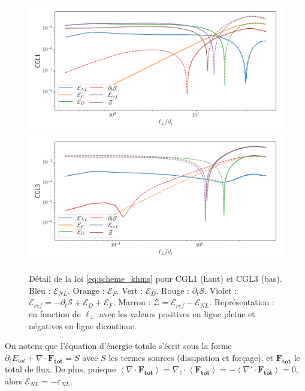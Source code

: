  \begin{figure}[!ht]
  \centering
 \includegraphics[width=0.9\linewidth,trim=0cm 0cm 0cm 0cm, clip=true]{./Mainmatter/Part_3/images_ch2/CGL1_1D_lperp_allSl}
 \includegraphics[width=0.9\linewidth,trim=0cm 0cm 0cm 0.5cm, clip=true]{./Mainmatter/Part_3/images_ch2/CGL3_1D_lperp_allSl}
 \cprotect\caption{Détail de la loi \eqref{eq:scheme_khms} pour CGL1 (haut) et CGL3 (bas). Bleu : \ensuremath{\mathcal{E}_{NL}}. Orange : \ensuremath{\mathcal{E}_{F}}. Vert : \ensuremath{\mathcal{E}_{D}}. Rouge : \ensuremath{\partial_t \mathcal{S}}. Violet : \ensuremath{\mathcal{E}_{ref} =- \partial_t \mathcal{S}  + \mathcal{E}_{D} + \mathcal{E}_{F}}. Marron : \ensuremath{\mathcal{Z} = \mathcal{E}_{ref} - \mathcal{E}_{NL}}. Représentation :  en fonction de \ensuremath{\ell_{\perp}} avec les valeurs positives en ligne pleine et négatives en ligne dicontinue. }
 \label{fig:KHMS}
 \end{figure}
 
On notera que l'équation d'énergie totale s'écrit sous la forme $\partial_t E_{tot} + \nabla \cdot \boldsymbol{F_{tot}} = S$ avec $S$ les termes sources (dissipation et forçage), et $\boldsymbol{F_{tot}}$ le total de flux. De plus, puisque $\left<  \nabla \cdot \boldsymbol{F_{tot}} \right> = \nabla_{\boldsymbol{\ell}} \cdot \left< \boldsymbol{F_{tot}} \right> = - \left<  \nabla' \cdot \boldsymbol{F_{tot}} \right> = 0$, alors $\mathcal{E}_{NL} =  - \varepsilon_{NL}$.
 
